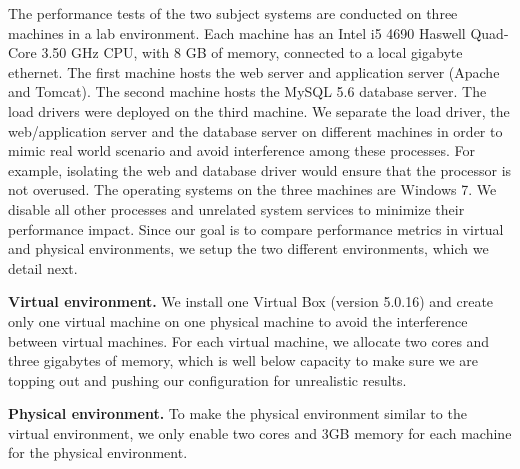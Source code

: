 The performance tests of the two subject systems are conducted on three machines in a lab environment. Each machine has an Intel i5 4690 Haswell Quad-Core 3.50 GHz CPU, with 8 GB of memory, connected to a local gigabyte ethernet. The first machine hosts the web server and application server (Apache and Tomcat). The second machine hosts the MySQL 5.6 database server. The load drivers were deployed on the third machine. We separate the load driver, the web/application server and the database server on different machines in order to mimic real world scenario and avoid interference among these processes. For example, isolating the web and database driver would ensure that the processor is not overused. The operating systems on the three machines are Windows 7. We disable all other processes and unrelated system services to minimize their performance impact. Since our goal is to compare performance metrics in virtual and physical environments, we setup the two different environments, which we detail next.

\noindent \textbf{Virtual environment.} We install one Virtual Box (version 5.0.16) and create only one virtual machine on one physical machine to avoid the interference between virtual machines. For each virtual machine, we allocate two cores and three gigabytes of memory, which is well below capacity to make sure we are topping out and pushing our configuration for unrealistic results. 


\noindent \textbf{Physical environment.} To make the physical environment similar to the virtual environment, we only enable two cores and 3GB memory for each machine for the physical environment. 


